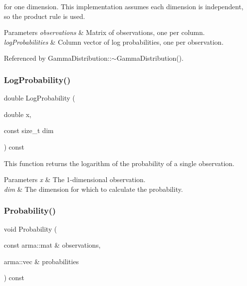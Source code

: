 for one dimension. This implementation assumes each dimension is independent, so the product rule is used.


\begin{DoxyParams}{Parameters}
{\em observations} & Matrix of observations, one per column. \\
\hline
{\em log\+Probabilities} & Column vector of log probabilities, one per observation. \\
\hline
\end{DoxyParams}


Referenced by Gamma\+Distribution\+::$\sim$\+Gamma\+Distribution().

\mbox{\label{classmlpack_1_1distribution_1_1GammaDistribution_a61f67c6ba839aa711f4eb108b31dfc56}} 
\subsubsection{Log\+Probability()\hspace{0.1cm}{\footnotesize\ttfamily [2/2]}}
{\footnotesize\ttfamily double Log\+Probability (\begin{DoxyParamCaption}\item[{double}]{x,  }\item[{const size\+\_\+t}]{dim }\end{DoxyParamCaption}) const}



This function returns the logarithm of the probability of a single observation. 


\begin{DoxyParams}{Parameters}
{\em x} & The 1-\/dimensional observation. \\
\hline
{\em dim} & The dimension for which to calculate the probability. \\
\hline
\end{DoxyParams}
\mbox{\label{classmlpack_1_1distribution_1_1GammaDistribution_aea9691b5cbbb57e28db1de846a50b44e}} 
\subsubsection{Probability()\hspace{0.1cm}{\footnotesize\ttfamily [1/2]}}
{\footnotesize\ttfamily void Probability (\begin{DoxyParamCaption}\item[{const arma\+::mat \&}]{observations,  }\item[{arma\+::vec \&}]{probabilities }\end{DoxyParamCaption}) const}



